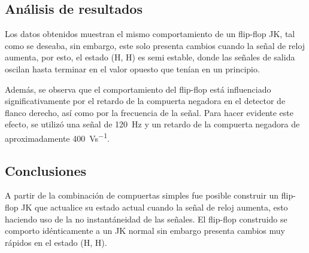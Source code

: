 \documentclass[journal, table]{IEEEtran}
\begin{document}
\subsection{Análisis de resultados}
Los datos obtenidos muestran el mismo comportamiento de un flip-flop JK, tal
como se deseaba, sin embargo, este solo presenta cambios cuando la señal de
reloj aumenta, por esto, el estado (H, H) es semi estable, donde las señales
de salida oscilan hasta terminar en el valor opuesto que tenían en un principio.

Además, se observa que el comportamiento del flip-flop está influenciado
significativamente por el retardo de la compuerta negadora en el detector de
flanco derecho, así como por la frecuencia de la señal. Para hacer evidente este
efecto, se utilizó una señal de \qty{120}{Hz} y un retardo de la compuerta
negadora de aproximadamente \qty{400}{Vs^{-1}}.

\subsection{Conclusiones}
A partir de la combinación de compuertas simples fue posible construir un flip-flop
JK que actualice su estado actual cuando la señal de reloj aumenta, esto haciendo
uso de la no instantáneidad de las señales. El flip-flop construido se comporto
idénticamente a un JK normal sin embargo presenta cambios muy rápidos en el estado
(H, H).

\printbibliography
\nocite{*}
\end{document}
